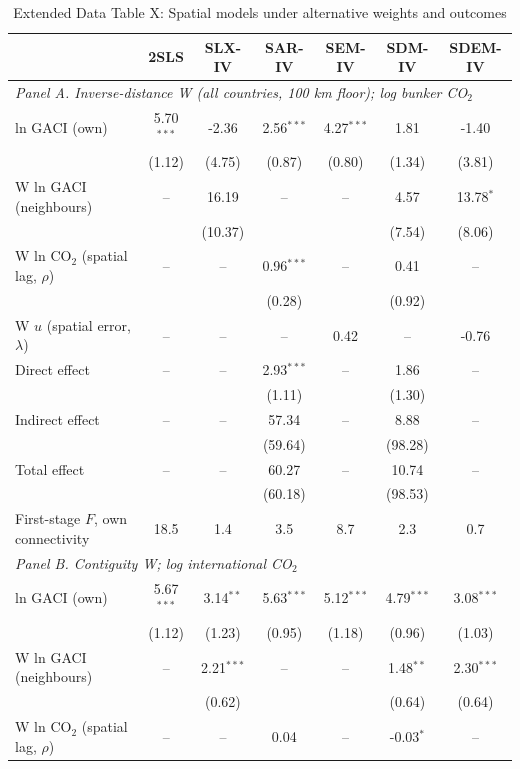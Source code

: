 \begin{table}[htbp]
\centering
\begin{threeparttable}
\caption{Extended Data Table X: Spatial models under alternative weights and outcomes}
\label{tab:spatial_ext}
\scriptsize
\begin{tabular}{lcccccc}
\toprule
 & 2SLS & SLX-IV & SAR-IV & SEM-IV & SDM-IV & SDEM-IV \\
\midrule
\multicolumn{7}{l}{\textit{Panel A. Inverse-distance W (all countries, 100 km floor); log bunker CO$_2$}} \\
  ln GACI (own) & 5.70$^{***}$ & -2.36 & 2.56$^{***}$ & 4.27$^{***}$ & 1.81 & -1.40 \\
   & (1.12) & (4.75) & (0.87) & (0.80) & (1.34) & (3.81) \\
  W ln GACI (neighbours) & -- & 16.19 & -- & -- & 4.57 & 13.78$^{*}$ \\
   &  & (10.37) &  &  & (7.54) & (8.06) \\
  W ln CO$_2$ (spatial lag, $\rho$) & -- & -- & 0.96$^{***}$ & -- & 0.41 & -- \\
   &  &  & (0.28) &  & (0.92) &  \\
  W $u$ (spatial error, $\lambda$) & -- & -- & -- & 0.42 & -- & -0.76 \\
  Direct effect & -- & -- & 2.93$^{***}$ & -- & 1.86 & -- \\
   &  &  & (1.11) &  & (1.30) &  \\
  Indirect effect & -- & -- & 57.34 & -- & 8.88 & -- \\
   &  &  & (59.64) &  & (98.28) &  \\
  Total effect & -- & -- & 60.27 & -- & 10.74 & -- \\
   &  &  & (60.18) &  & (98.53) &  \\
  First-stage $F$, own connectivity & 18.5 & 1.4 & 3.5 & 8.7 & 2.3 & 0.7 \\
\midrule
\multicolumn{7}{l}{\textit{Panel B. Contiguity W; log international CO$_2$}} \\
  ln GACI (own) & 5.67$^{***}$ & 3.14$^{**}$ & 5.63$^{***}$ & 5.12$^{***}$ & 4.79$^{***}$ & 3.08$^{***}$ \\
   & (1.12) & (1.23) & (0.95) & (1.18) & (0.96) & (1.03) \\
  W ln GACI (neighbours) & -- & 2.21$^{***}$ & -- & -- & 1.48$^{**}$ & 2.30$^{***}$ \\
   &  & (0.62) &  &  & (0.64) & (0.64) \\
  W ln CO$_2$ (spatial lag, $\rho$) & -- & -- & 0.04 & -- & -0.03$^{*}$ & -- \\

\end{tabular}
\end{threeparttable}
\end{table}
